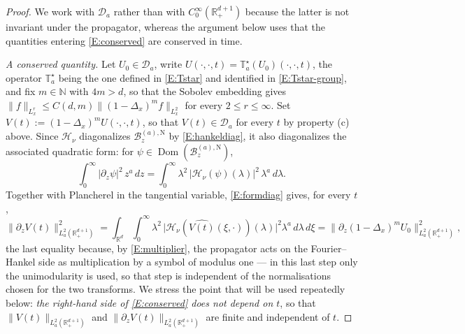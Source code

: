 \documentclass[11pt,letter]{amsart}
\def \RN {\mathbb{R}_+^{d+1}}
\newcommand{\BaN}{\mathscr B_z^{(a),\mathrm N}}
\newcommand{\Rd}{\mathbb R^d}
\newcommand{\p}{\partial}
\numberwithin{equation}{section}
\newcommand{\Dom}{\operatorname{Dom}}
\numberwithin{equation}{section}
\begin{document}
\begin{proof}
\smallskip
\noindent
We work with
$\mathcal D_a$ rather than with $C_0^\infty(\RN)$ because the latter is not
invariant under the propagator, whereas the argument below uses that the
quantities entering \eqref{E:conserved} are conserved in time.

\smallskip
\noindent\emph{A conserved quantity.} Let $U_0\in\mathcal D_a$,
write $U(\cdot,\cdot,t)=\mathbb T_a^\star(U_0)(\cdot,\cdot,t)$, the operator
$\mathbb T^\star_a$ being the one defined in \eqref{E:Tstar} and identified in
\eqref{E:Tstar-group}, and fix
$m\in\mathbb N$ with $4m>d$, so that the Sobolev embedding gives
$\|f\|_{L^r_x}\le C(d,m)\|(1-\Delta_x)^mf\|_{L^2_x}$ for every $2\le r\le\infty$.
Set $V(t):=(1-\Delta_x)^mU(\cdot,\cdot,t)$, so that $V(t)\in\mathcal D_a$ for
every $t$ by property (c) above. Since $\mathcal H_\nu$ diagonalizes
$\BaN$ by \eqref{E:hankeldiag}, it also diagonalizes the associated
quadratic form: for $\psi\in\Dom(\BaN)$,
\begin{equation}\label{E:formdiag}
\int_0^\infty|\p_z\psi|^2\,z^a\,dz
=\int_0^\infty\lambda^2\,|\mathcal H_\nu(\psi)(\lambda)|^2\,\lambda^a\,d\lambda .
\end{equation}
Together with Plancherel in the tangential variable, \eqref{E:formdiag} gives,
for every $t$,
\begin{equation}\label{E:conserved}
\|\p_zV(t)\|_{L^2_a(\RN)}^2
=\int_{\Rd}\!\int_0^\infty \lambda^2\,
\bigl|\mathcal H_{\nu}(\widehat{V(t)}(\xi,\cdot))(\lambda)\bigr|^2
\lambda^a\,d\lambda\,d\xi
=\|\p_z(1-\Delta_x)^mU_0\|_{L^2_a(\RN)}^2 ,
\end{equation}
the last equality because, by \eqref{E:multiplier}, the propagator acts on the
Fourier--Hankel side as multiplication by a symbol of modulus one --- in this
last step only the unimodularity is used, so that step is independent of the
normalisations chosen for the two transforms. We stress the point that will be
used repeatedly below: \emph{the right-hand side of \eqref{E:conserved} does not
depend on $t$}, so that $\|V(t)\|_{L^2_a(\RN)}$ and $\|\p_zV(t)\|_{L^2_a(\RN)}$
are finite and independent of $t$.


\end{proof}
\end{document}
